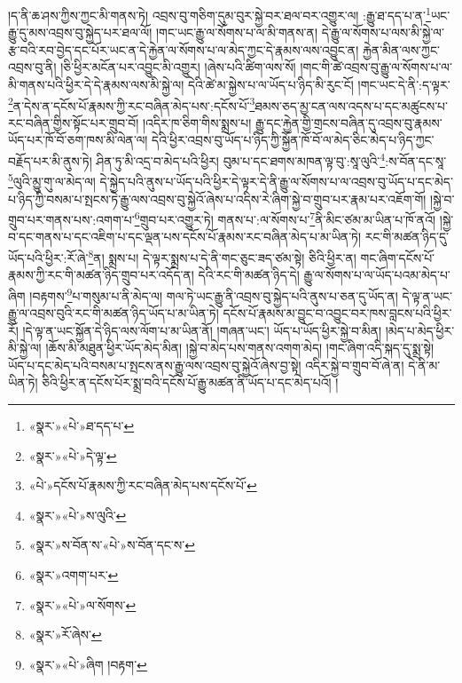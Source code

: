 །ད་ནི་ཆ་ཤས་ཀྱིས་ཀྱང་མི་གནས་ཏེ། འབྲས་བུ་གཅིག་དུམ་བུར་སྐྱེ་བར་ཐལ་བར་འགྱུར་ལ། :རྒྱུ་ཐ་དད་པ་ན་\footnote{«སྣར་»«པེ་»ཐ་དད་པ་}ཡང་རྒྱུ་དུ་མས་འབྲས་བུ་སྐྱེད་པར་ཐལ་ལོ། །གང་ཡང་རྒྱུ་ལ་སོགས་པ་ལ་མི་གནས་ན། དེ་རྒྱུ་ལ་སོགས་པ་ལས་མི་སྐྱེ་ལ་རྩ་བའི་རབ་བྱེད་དང་པོར་ཡང་ན་དེ་རྐྱེན་ལ་སོགས་པ་ལ་མེད་ཀྱང་དེ་རྣམས་ལས་འབྱུང་ན། རྐྱེན་མིན་ལས་ཀྱང་འབྲས་བུ་ནི། །ཅི་ཕྱིར་མངོན་པར་འབྱུང་མི་འགྱུར། །ཞེས་པའི་ཚིག་ལས་སོ། །གང་གི་ཚེ་འབྲས་བུ་རྒྱུ་ལ་སོགས་པ་ལ་མི་གནས་པའི་ཕྱིར་དེ་དེ་རྣམས་ལས་མི་སྐྱེ་ལ། དེའི་ཚེ་མ་སྐྱེས་པ་ལ་ཡོད་པ་ཉིད་མི་རུང་ངོ། །གང་ཡང་དེ་ནི་:ད་ལྟར་\footnote{«སྣར་»«པེ་»དེ་ལྟ་}ན་དེས་ན་དངོས་པོ་རྣམས་ཀྱི་རང་བཞིན་མེད་པས་:དངོས་པོ་\footnote{«པེ་»དངོས་པོ་རྣམས་ཀྱི་རང་བཞིན་མེད་པས་དངོས་པོ་}ཐམས་ཅད་མྱ་ངན་ལས་འདས་པ་དང་མཚུངས་པ་རང་བཞིན་གྱིས་སྟོང་པར་གྲུབ་བོ། །འདིར་ཁ་ཅིག་གིས་སྨྲས་པ། རྒྱུ་དང་རྐྱེན་གྱི་གྲངས་བཞིན་དུ་འབྲས་བུ་རྣམས་ཡོད་པར་ཁོ་བོ་ཅག་ཁས་མི་ལེན་ལ། དེའི་ཕྱིར་འབྲས་བུ་ཡོད་པ་ཉིད་ཀྱི་སྐྱོན་ཁོ་བོ་ལ་མེད་ཅིང་མེད་པ་ཉིད་ཀྱང་བརྗོད་པར་མི་ནུས་ཏེ། ཤིན་ཏུ་མི་འདྲ་བ་མེད་པའི་ཕྱིར། བུམ་པ་དང་ཐགས་མཁན་ལྟ་བུ་:སཱ་ལུའི་\footnote{«སྣར་»«པེ་»ས་ལུའི་}:ས་བོན་དང་སཱ་\footnote{«སྣར་»ས་བོན་ས་«པེ་»ས་བོན་དང་ས་}ལུའི་མྱུ་གུ་ལ་མེད་ལ། དེ་སྐྱེད་པའི་ནུས་པ་ཡོད་པའི་ཕྱིར་དེ་ལྟར་དེ་ནི་རྒྱུ་ལ་སོགས་པ་ལ་འབྲས་བུ་ཡོད་པ་དང་མེད་པ་ཉིད་ཀྱི་བསམ་པ་སྤངས་ཏེ་རྒྱུ་ལས་འབྲས་བུ་སྐྱེའོ་ཞེས་པ་འདིས་རེ་ཞིག་སྐྱེ་བ་གྲུབ་པར་རྣམ་པར་འཇོག་གོ། །སྐྱེ་བ་གྲུབ་པར་གནས་པས་:འགག་པ་\footnote{«སྣར་»འགག་པར་}གྲུབ་པར་འགྱུར་ཏེ། གནས་པ་:ལ་སོགས་པ་\footnote{«སྣར་»«པེ་»ལ་སོགས་}ནི་མིང་ཙམ་མ་ཡིན་པ་ཁོ་ནའོ། །སྐྱེ་བ་དང་གནས་པ་དང་འཇིག་པ་དང་ལྡན་པས་དངོས་པོ་རྣམས་རང་བཞིན་མེད་པ་མ་ཡིན་ཏེ། རང་གི་མཚན་ཉིད་དུ་ཡོད་པའི་ཕྱིར་:རོ་ཞེ་\footnote{«སྣར་»རོ་ཞེས་}ན། སྨྲས་པ། དེ་ལྟར་སྨྲས་པ་དེ་ནི་གང་ཅུང་ཟད་ཙམ་སྟེ། ཅིའི་ཕྱིར་ན། གང་ཞིག་དངོས་པོ་རྣམས་ཀྱི་རང་གི་མཚན་ཉིད་གྲུབ་པར་འདོད་ན། དེའི་རང་གི་མཚན་ཉིད་དེ། རྒྱུ་ལ་སོགས་པ་ལ་ཡོད་པའམ་མེད་པ་ཞིག །བརྟགས་\footnote{«སྣར་»«པེ་»ཞིག །བརྟག་}པ་གསུམ་པ་ནི་མེད་ལ། གལ་ཏེ་ཡང་རྒྱུ་ནི་འབྲས་བུ་སྐྱེད་པའི་ནུས་པ་ཅན་དུ་ཡོད་ན། དེ་ལྟ་ན་ཡང་རྒྱུ་ལ་འབྲས་བུའི་རང་གི་མཚན་ཉིད་ཡོད་པ་མ་ཡིན་ཏེ། དངོས་པོ་རྣམས་མ་བྱུང་བ་འབྱུང་བར་ཁས་བླངས་པའི་ཕྱིར་རོ། །དེ་ལྟ་ན་ཡང་སྐྱོན་དེ་ཉིད་ལས་ལོག་པ་མ་ཡིན་ནོ། །གཞན་ཡང་། ཡོད་པ་ཡོད་ཕྱིར་སྐྱེ་བ་མིན། །མེད་པ་མེད་ཕྱིར་མི་སྐྱེ་ལ། །ཆོས་མི་མཐུན་ཕྱིར་ཡོད་མེད་མིན། །སྐྱེ་བ་མེད་པས་གནས་འགག་མེད། །གང་ཞིག་འདི་སྐད་དུ་སྨྲ་སྟེ། ཡོད་པ་དང་མེད་པའི་བསམ་པ་སྤངས་ནས་རྒྱུ་ལས་འབྲས་བུ་སྐྱེའོ་ཞེས་བྱ་སྟེ། འདིར་སྐྱེ་བ་གྲུབ་བོ་ཞེ་ན། དེ་ནི་མ་ཡིན་ཏེ། ཅིའི་ཕྱིར་ན་དངོས་པོར་སྨྲ་བའི་དངོས་པོ་རྒྱུ་མཚན་ནི་ཡོད་པ་དང་མེད་པའོ། །
